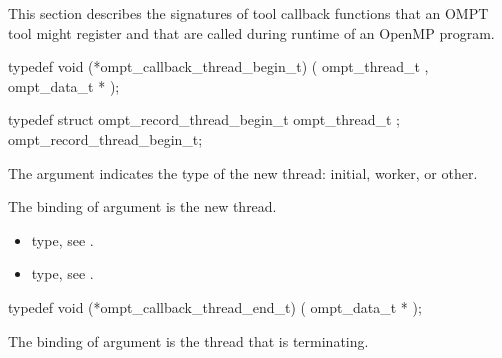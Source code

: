 This section describes the signatures of tool callback functions that an OMPT
tool might register and that are called during runtime of an OpenMP program.

\label{sec:ompt_callback_thread_begin_t}
\format

\begin{ccppspecific}
\begin{omptCallback}
typedef void (*ompt_callback_thread_begin_t) (
  ompt_thread_t ,
  ompt_data_t *
);
\end{omptCallback}
\end{ccppspecific}


\record

\begin{ccppspecific}
\begin{omptRecord}
typedef struct ompt_record_thread_begin_t {
  ompt_thread_t ;
} ompt_record_thread_begin_t;
\end{omptRecord}
\end{ccppspecific}


\argdesc

The argument 
indicates the type of the new thread: initial, worker, or other.

The binding of argument  is the new thread.

\crossreferences
\begin{itemize}
\item {} type, see
.
\item {} type, see
.
\end{itemize}



\label{sec:ompt_callback_thread_end_t}
\format

\begin{ccppspecific}
\begin{omptCallback}
typedef void (*ompt_callback_thread_end_t) (
  ompt_data_t *
);
\end{omptCallback}
\end{ccppspecific}


\argdesc

The binding of argument  is the thread that is
terminating.

